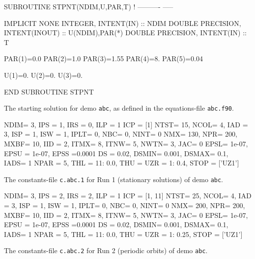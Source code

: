 \documentclass[12pt]{report}
\begin{document}
\begin{table}[htbp]
{\small
\begin{center}
\begin{boxedverbatim}
      SUBROUTINE STPNT(NDIM,U,PAR,T) 
!     ---------- ----- 

      IMPLICIT NONE
      INTEGER, INTENT(IN) :: NDIM
      DOUBLE PRECISION, INTENT(INOUT) :: U(NDIM),PAR(*)
      DOUBLE PRECISION, INTENT(IN) :: T

       PAR(1)=0.0
       PAR(2)=1.0
       PAR(3)=1.55
       PAR(4)=8.
       PAR(5)=0.04

       U(1)=0.
       U(2)=0.
       U(3)=0.

      END SUBROUTINE STPNT
\end{boxedverbatim}
\end{center}
}
\caption{The starting solution for demo {\tt abc}, 
as defined in the equations-file {\tt abc.f90}.}
\label{tbl:demo_abcE2}
\end{table}

\begin{table}[htbp]
{\small
\begin{center}
\begin{boxedverbatim}
NDIM=   3, IPS =   1, IRS =   0, ILP =   1
ICP =  [1]
NTST=  15, NCOL=   4, IAD =   3, ISP =   1, ISW = 1, IPLT= 0, NBC= 0, NINT= 0
NMX=  130, NPR=  200, MXBF=  10, IID =   2, ITMX= 8, ITNW= 5, NWTN= 3, JAC= 0
EPSL= 1e-07, EPSU = 1e-07, EPSS =0.0001
DS  =  0.02, DSMIN= 0.001, DSMAX=   0.1, IADS=   1
NPAR = 5, THL =  {11: 0.0}, THU =  {}
UZR =  {1: 0.4}, STOP = ['UZ1']
\end{boxedverbatim}
\end{center}
}
\caption{The constants-file {\tt c.abc.1} for Run 1 (stationary solutions)
of demo {\tt abc}.}
\label{tbl:demo_abcC1}
\end{table}


\begin{table}[htbp]
{\small
\begin{center}
\begin{boxedverbatim}
NDIM=   3, IPS =   2, IRS =   2, ILP =   1
ICP =  [1, 11]
NTST=  25, NCOL=   4, IAD =   3, ISP =   1, ISW = 1, IPLT= 0, NBC= 0, NINT= 0
NMX=  200, NPR=  200, MXBF=  10, IID =   2, ITMX= 8, ITNW= 5, NWTN= 3, JAC= 0
EPSL= 1e-07, EPSU = 1e-07, EPSS =0.0001
DS  =  0.02, DSMIN= 0.001, DSMAX=   0.1, IADS=   1
NPAR = 5, THL =  {11: 0.0}, THU =  {}
UZR =  {1: 0.25}, STOP = ['UZ1']
\end{boxedverbatim}
\end{center}
}
\caption{The constants-file {\tt c.abc.2} for Run 2 (periodic orbits) 
of demo {\tt abc}.}
\label{tbl:demo_abcC2}
\end{table}
\end{document}
